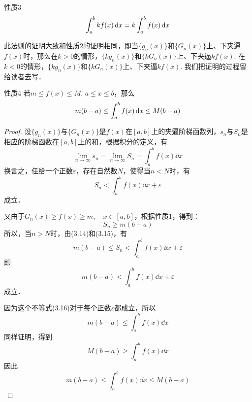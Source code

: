 \begin{blk}{性质3}
\[\displaystyle\int^b_a kf(x)\,{\rm d} x =k\displaystyle\int^b_a f(x)\,{\rm d} x \]
\end{blk}

此法则的证明大致和性质2的证明相同，即当$\{g_n(x)\}$和$\{G_n(x)\}$上、下夹逼$f(x)$时，那么在$k>0$的情形，$\{kg_n(x)\}$和$\{kG_n(x)\}$上、下夹逼$kf(x)$; 在$k<0$的情形，$\{kg_n(x)\}$和$\{kG_n(x)\}$上、下夹逼$kf(x)$. 我们把证明的过程留给读者去写．

\begin{blk}{性质4}
    若$m\le f(x)\le M$, $a\le x\le b$，那么
    \[m(b-a)\le \displaystyle\int^b_a f(x)\,{\rm d} x \le M(b-a) \]
    \end{blk}

\begin{proof}
    设$\{g_n(x)\}$与$\{G_n(x)\}$是$f(x)$在$[a,b]$上的夹逼阶梯函数列，$s_n$与$S_n$是相应的阶梯函数在$[a,b]$上的和，根据积分的定义，有
\[\lim_{n\to\infty}s_n=\lim_{n\to\infty}S_n=\int^b_a f(x)\dd x\]
换言之，任给一个正数$\varepsilon$，存在自然数$N$，使得当$n<N$时，有
\begin{equation}
    S_n<\int^b_a f(x)\dd x+\varepsilon
\end{equation}
成立．

又由于$G_n(x)\ge f(x)\ge m,\quad x\in[a,b]$，根据性质1，得到：
\begin{equation}
    S_n\ge m(b-a)
\end{equation}
所以，当$n>N$时，由(3.14)和(3.15)，有
\[m(b-a)\le S_n<\int^b_a f(x)\dd x+\varepsilon\]
即
\begin{equation}
    m(b-a)<\int^b_a f(x)\dd x+\varepsilon
\end{equation}
成立．

因为这个不等式(3.16)对于每个正数$\varepsilon$都成立，所以
\[m(b-a)\le \int^b_a f(x)\dd x\]
同样证明，得到
\[M(b-a)\ge \int^b_a f(x)\dd x\]
因此
\[m(b-a)\le \int^b_a f(x)\dd x\le M(b-a)\]
\end{proof}

\begin{figure}[htp]
    \centering
{}
    \caption{}
\end{figure}

